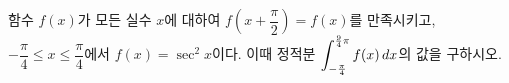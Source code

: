 함수 $f(x)$가 모든 실수 $x$에 대하여 $f\!\left(x+\dfrac{\pi}{2}\right)=f(x)$를 만족시키고, $-\dfrac{\pi}{4}\le x\le\dfrac{\pi}{4}$에서 $f(x)=\sec^2 x$이다. 이때 정적분 $\displaystyle\int_{-\frac{\pi}{4}}^{\frac{9}{4}\pi}f(x)\mkern3mu dx$의 값을 구하시오.
